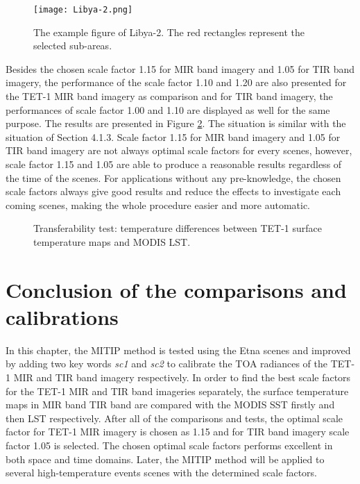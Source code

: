 \begin{figure}[!htbp]
\centering
\texttt{[image: Libya-2.png]}
\caption{The example figure of Libya-2. The red rectangles represent the selected sub-areas.}
\label{fig:Libya2_sub_areas}
\end{figure}

\noindent Besides the chosen scale factor 1.15 for MIR band imagery and 1.05 for TIR band imagery, the performance of the scale factor 1.10 and 1.20 are also presented for the TET-1 MIR band imagery as comparison and for TIR band imagery, the performances of scale factor 1.00 and 1.10 are displayed as well for the same purpose. The results are presented in Figure \ref{fig:LST_test}. The situation is similar with the situation of Section 4.1.3. Scale factor 1.15 for MIR band imagery and 1.05 for TIR band imagery are not always optimal scale factors for every scenes, however, scale factor 1.15 and 1.05 are able to produce a reasonable results regardless of the time of the scenes. For applications without any pre-knowledge, the chosen scale factors always give good results and reduce the effects to investigate each coming scenes, making the whole procedure easier and more automatic.\\

\begin{figure}[!htbp]
\centering
{}
\hspace{0.5in}
\caption{Transferability test: temperature differences between TET-1 surface temperature maps and MODIS LST.}
\label{fig:LST_test}
\end{figure}


\section{Conclusion of the comparisons and calibrations}
In this chapter, the MITIP method is tested using the Etna scenes and improved by adding two key words \emph{sc1} and \emph{sc2} to calibrate the TOA radiances of the TET-1 MIR and TIR band imagery respectively. In order to find the best scale factors for the TET-1 MIR and TIR band imageries separately, the surface temperature maps in MIR band TIR band are compared with the MODIS SST firstly and then LST respectively. After all of the comparisons and tests, the optimal scale factor for TET-1 MIR imagery is chosen as 1.15 and for TIR band imagery scale factor 1.05 is selected. The chosen optimal scale factors performs excellent in both space and time domains. Later, the MITIP method will be applied to several high-temperature events scenes with the determined scale factors.\\